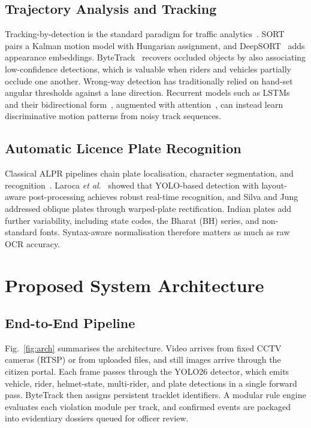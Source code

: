 \documentclass[conference]{IEEEtran}
\begin{document}
\subsection{Trajectory Analysis and Tracking}
Tracking-by-detection is the standard paradigm for traffic analytics~\cite{buch2011review}. SORT~\cite{bewley2016sort} pairs a Kalman motion model with Hungarian assignment, and DeepSORT~\cite{wojke2017deepsort} adds appearance embeddings. ByteTrack~\cite{zhang2022bytetrack} recovers occluded objects by also associating low-confidence detections, which is valuable when riders and vehicles partially occlude one another. Wrong-way detection has traditionally relied on hand-set angular thresholds against a lane direction. Recurrent models such as LSTMs~\cite{hochreiter1997lstm} and their bidirectional form~\cite{graves2005bilstm}, augmented with attention~\cite{bahdanau2015attention}, can instead learn discriminative motion patterns from noisy track sequences.

\subsection{Automatic Licence Plate Recognition}
Classical ALPR pipelines chain plate localisation, character segmentation, and recognition~\cite{du2013alpr}. Laroca \emph{et al.}~\cite{laroca2018} showed that YOLO-based detection with layout-aware post-processing achieves robust real-time recognition, and Silva and Jung~\cite{silva2018} addressed oblique plates through warped-plate rectification. Indian plates add further variability, including state codes, the Bharat (BH) series, and non-standard fonts. Syntax-aware normalisation therefore matters as much as raw OCR accuracy.

\section{Proposed System Architecture}

\subsection{End-to-End Pipeline}
Fig.~\ref{fig:arch} summarises the architecture. Video arrives from fixed CCTV cameras (RTSP) or from uploaded files, and still images arrive through the citizen portal. Each frame passes through the YOLO26 detector, which emits vehicle, rider, helmet-state, multi-rider, and plate detections in a single forward pass. ByteTrack then assigns persistent tracklet identifiers. A modular rule engine evaluates each violation module per track, and confirmed events are packaged into evidentiary dossiers queued for officer review.
\end{document}
